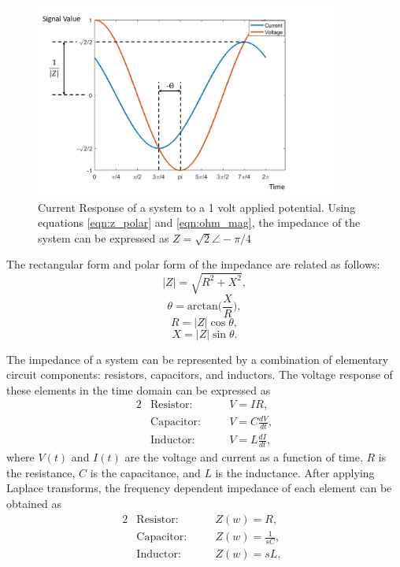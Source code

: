  \begin{figure}[ht]
    \centering
    \includegraphics[width=0.9\textwidth]{images/ac_signal.png}
    \caption[Current Response of a system to an applied voltage]{Current Response of a system to a 1 volt applied potential. Using equations \ref{eqn:z_polar} and \ref{eqn:ohm_mag}, the impedance of the system can be expressed as $Z=\sqrt{2}\angle -\pi/4$} 
    \label{fig:ac_signal}
 \end{figure}
 
 \par The rectangular form and polar form of the impedance are related as follows:
 \begin{equation}
     |Z| = \sqrt{R^2 + X^2},
 \end{equation}
 \begin{equation}
    \theta = \text{arctan}\Big(\frac{X}{R}\Big),
 \end{equation}
 \begin{equation}
    R = |Z|\cos\theta,
 \end{equation}
 \begin{equation}
     X = |Z|\sin\theta.
 \end{equation}
 
 \par The impedance of a system can be represented by a combination of elementary circuit components: resistors, capacitors, and inductors. The voltage response of these elements in the time domain can be expressed as
 \begin{alignat}{2}
    &\text{Resistor:} \quad  &&V = IR, \label{eqn:ohms_law}\\
    &\text{Capacitor:} \quad &&V = C \frac{dV}{dt},\\
    &\text{Inductor:} \quad  &&V = L \frac{dI}{dt},
 \end{alignat}
 \noindent where $V(t)$ and $I(t)$ are the voltage and current as a function of time, $R$ is the resistance, $C$ is the capacitance, and $L$ is the inductance. After applying Laplace transforms, the frequency dependent impedance of each element can be obtained as
  \begin{alignat}{2}
    &\text{Resistor:} \quad  &&Z(w) = R, \;\;\;\\
    &\text{Capacitor:} \quad &&Z(w) = \frac{1}{sC},\\
    &\text{Inductor:} \quad  &&Z(w) = sL,
 \end{alignat}
 
